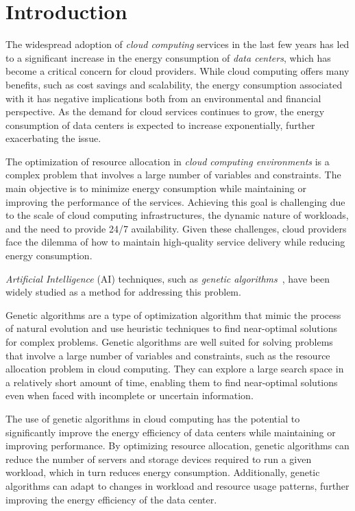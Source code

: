\section{Introduction}\label{sect:intro}

The widespread adoption of \textit{cloud computing} services in the last few years has led to a significant increase in the energy consumption 
of \textit{data centers}, which has become a critical concern for cloud providers. 
While cloud computing offers many benefits, such as cost savings and scalability, 
the energy consumption associated with it has negative implications both from an environmental and financial perspective. 
As the demand for cloud services continues to grow, the energy consumption of data centers is expected to increase exponentially, 
further exacerbating the issue.

The optimization of resource allocation in \textit{cloud computing environments} is a complex problem that involves a large number of variables and constraints. 
The main objective is to minimize energy consumption while maintaining or improving the performance of the services. 
Achieving this goal is challenging due to the scale of cloud computing infrastructures, the dynamic nature of workloads, and the need to provide 24/7 availability. 
Given these challenges, cloud providers face the dilemma of how to maintain high-quality service delivery while reducing energy consumption.

\textit{Artificial Intelligence} (AI) techniques, such as \textit{genetic algorithms}~\cite{mitchell1998introduction}, have been widely studied as a method for addressing this problem. 

Genetic algorithms are a type of optimization algorithm that mimic the process of natural evolution and use heuristic techniques to find near-optimal solutions 
for complex problems. Genetic algorithms are well suited for solving problems that involve a large number of variables and constraints, 
such as the resource allocation problem in cloud computing. They can explore a large search space in a relatively short amount of time, 
enabling them to find near-optimal solutions even when faced with incomplete or uncertain information.~\cite{forrest1996genetic}

The use of genetic algorithms in cloud computing has the potential to significantly improve the energy efficiency of data centers while maintaining or improving performance. 
By optimizing resource allocation, genetic algorithms can reduce the number of servers and storage devices required to run a given workload, 
which in turn reduces energy consumption. Additionally, genetic algorithms can adapt to changes in workload and resource usage patterns, 
further improving the energy efficiency of the data center.

